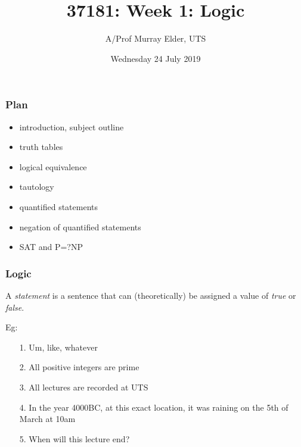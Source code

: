 \documentclass[10pt]{beamer}
\title{37181: Week 1:  Logic}
\date{Wednesday 24 July 2019}
\author{A/Prof Murray Elder, UTS}
\theoremstyle{definition}
\begin{document}






%
\begin{frame}
\titlepage %
\vspace{5cm}
\vfill
\end{frame}








\begin{frame}
\frametitle{Plan}



\begin{itemize}
 \item introduction, subject outline
\bigskip \item truth tables
\bigskip \item logical equivalence
\bigskip \item  tautology
\bigskip \item quantified statements
\bigskip \item negation of quantified statements
\bigskip \item SAT and P=?NP
 \end{itemize}


\vspace{0cm}
\vfill
\end{frame}





\begin{frame}
\frametitle{Logic}

\begin{definition}
A {\em statement} is a sentence that can (theoretically) be assigned a value of {\em true} or {\em false}.\end{definition}

\bigskip\pause

Eg:
\begin{enumerate}
\item[1.] Um, like, whatever\bigskip
\item[2.] All positive integers are prime\bigskip
\item[3.] All lectures are recorded at UTS\bigskip
\item[4.] In the year 4000BC, at this exact location, it was raining on the 5th of March at 10am\bigskip
\item[5.] When will this lecture end?
\end{enumerate}


\vspace{2cm}
\vfill
\end{frame}
\end{document}
